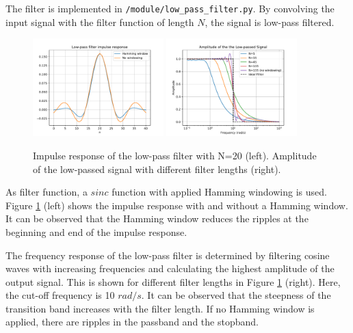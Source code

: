 \documentclass[12pt, a4paper]{report}
\begin{document}
The filter is implemented in \texttt{/module/low\_pass\_filter.py}.
By convolving the input signal with the filter function of length \(N\),
the signal is low-pass filtered.

\begin{figure}[h!]
	\centering
	\includegraphics[width=0.45\textwidth]{figures/impulse_response.pdf}
	\includegraphics[width=0.45\textwidth]{figures/passband.pdf}
	\caption{Impulse response of the low-pass filter with N=20 (left). Amplitude of the low-passed signal with different filter lengths (right).}
	\label{fig:low_pass_filter}
\end{figure}
As filter function, a \(sinc\) function with applied Hamming windowing is used.
Figure \ref{fig:low_pass_filter} (left) shows the impulse response with and without a Hamming window.
It can be observed that the Hamming window reduces the ripples at the beginning and end of the impulse response.

The frequency response of the low-pass filter is determined by filtering cosine waves with increasing frequencies
and calculating the highest amplitude of the output signal.
This is shown for different filter lengths in Figure \ref{fig:low_pass_filter} (right).
Here, the cut-off frequency is 10 \({rad}/s\).
It can be observed that the steepness of the transition band increases with the filter length.
If no Hamming window is applied, there are ripples in the passband and the stopband.
\end{document}
